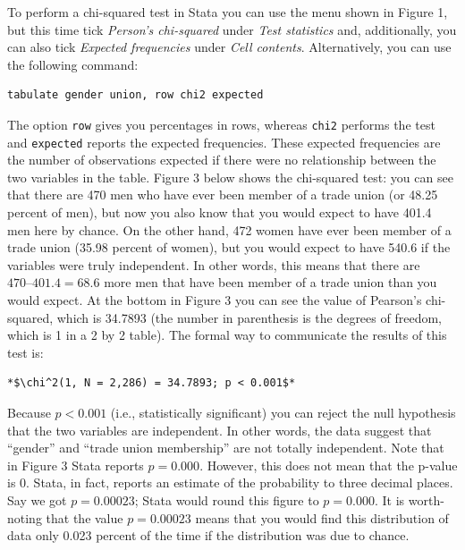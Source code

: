 \documentclass{article}
\begin{document}
To perform a chi-squared test in Stata you can use the menu shown in Figure 1, but this time tick \textit{Person's chi-squared} under \textit{Test statistics} and, additionally, you can also tick \textit{Expected frequencies} under \textit{Cell contents}. Alternatively, you can use the following command:

\begin{lstlisting}
tabulate gender union, row chi2 expected
\end{lstlisting}

The option \texttt{row} gives you percentages in rows, whereas \texttt{chi2} performs the test and \texttt{expected} reports the expected frequencies. These expected frequencies are the number of observations expected if there were no relationship between the two variables in the table. Figure 3 below shows the chi-squared test: you can see that there are 470 men who have ever been member of a trade union (or 48.25 percent of men), but now you also know that you would expect to have 401.4 men here by chance. On the other hand, 472 women have ever been member of a trade union (35.98 percent of women), but you would expect to have 540.6 if the variables were truly independent. In other words, this means that there are $470 – 401.4 = 68.6$ more men that have been member of a trade union than you would expect. At the bottom in Figure 3 you can see the value of Pearson's chi-squared, which is 34.7893 (the number in parenthesis is the degrees of freedom, which is 1 in a 2 by 2 table). The formal way to communicate the results of this test is:

\begin{lstlisting}[escapeinside=**]
*$\chi^2(1, N = 2,286) = 34.7893; p < 0.001$*
\end{lstlisting}

Because $p < 0.001$ (i.e., statistically significant) you can reject the null hypothesis that the two variables are independent. In other words, the data suggest that ``gender'' and ``trade union membership'' are not totally independent. Note that in Figure 3 Stata reports $p = 0.000$. However, this does not mean that the p-value is 0. Stata, in fact, reports an estimate of the probability to three decimal places. Say we got $p = 0.00023$; Stata would round this figure to $p = 0.000$. It is worth-noting that the value $p = 0.00023$ means that you would find this distribution of data only 0.023 percent of the time if the distribution was due to chance.
\end{document}
